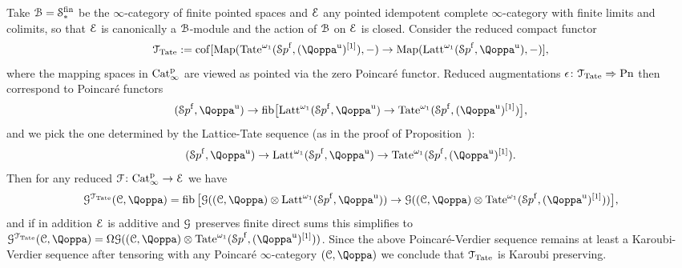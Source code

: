 \begin{example}
\label{example:lattice-tate}%
Take $\mathcal{B} = \mathcal S^{\mathrm{fin}}_*$ be the $\infty$-category of finite pointed spaces and $\mathcal{E}$ any pointed idempotent complete $\infty$-category with finite limits and colimits, so that $\mathcal{E}$ is canonically a $\mathcal{B}$-module and the action of $\mathcal{B}$ on $\mathcal{E}$ is closed.
Consider the reduced compact functor
\[
\T_{\Tate} := \cof[\Map(\Tate^{\omega_1}(\Spaf, (\QF^{\uni})\qshift{1}),-) \to \Map(\Latt^{\omega_1}(\Spaf, \QF^{\uni}),-)],
\]
where the mapping spaces in $\mathrm{Cat}^{\mathrm p}_\infty$ are viewed as pointed via the zero Poincaré functor.
Reduced augmentations $\epsilon\colon\mathcal{T}_{\operatorname{Tate}} \Rightarrow \mathrm{Pn}$ then correspond to Poincaré functors 
\[
(\Spaf,\QF^{\uni}) \to \fib\bigl[\Latt^{\omega_1}(\Spaf, \QF^{\uni}) \to \Tate^{\omega_1}(\Spaf, (\QF^{\uni})\qshift{1})\bigr] ,
\]
and we pick the one determined by the Lattice-Tate sequence (as in the proof of Proposition~):
\[
(\Spaf,\QF^{\uni}) \to \Latt^{\omega_1}(\Spaf, \QF^{\uni}) \to \Tate^{\omega_1}(\Spaf, (\QF^{\uni})\qshift{1}).
\]
Then for any reduced $\mathcal{F}\colon \mathrm{Cat}^{\mathrm p}_\infty \to \mathcal{E}$ we have 
\[
\G^{\T_{\Tate}}(\C,\QF) = \fib\big[\G((\C,\QF)\otimes \Latt^{\omega_1}(\Spaf, \QF^{\uni})) \to \G((\C,\QF) \otimes \Tate^{\omega_1}(\Spaf, (\QF^{\uni})\qshift{1}))\big],
\]
and if in addition $\mathcal{E}$ is additive and $\mathcal{G}$ preserves finite direct sums this simplifies to $\G^{\T_{\Tate}}(\C,\QF) = \Om\G((\C,\QF) \otimes \Tate^{\omega_1}(\Spaf, (\QF^{\uni})\qshift{1}))$. 
Since the above Poincaré-Verdier sequence remains at least a Karoubi-Verdier sequence after tensoring with any Poincaré $\infty$-category $(\C,\QF)$ we conclude that $\mathcal{T}_{\operatorname{Tate}}$ is Karoubi preserving.
\end{example}


